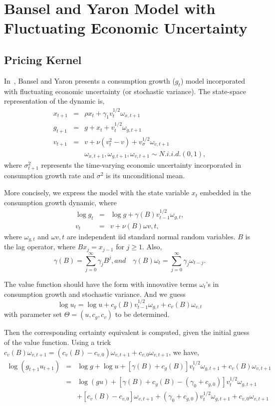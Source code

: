 \documentclass[11pt,reqno,final]{amsart}
\begin{document}
\bigskip

\section{Bansel and Yaron Model with Fluctuating Economic Uncertainty}
\subsection{Pricing Kernel} \label{sec::by2_sv}
In~\cite{BY04}, Bansel and Yaron presents a consumption growth ($g_t$) model incorporated with fluctuating economic uncertainty (or stochastic variance). The state-space representation of the dynamic is,
\begin{eqnarray}
x_{t+1} &=& \rho x_t + \gamma_1 v^{1/2}_t \omega_{x,t+1} \nonumber \\
g_{t+1} &=& g + x_t + v^{1/2}_t \omega_{g,t+1} \\
v_{t+1} &=& v + \nu(v_t^2-v) + v_{\sigma}^{1/2} \omega_{v,t+1}  \nonumber \\
    & & \omega_{x,t+1}, \omega_{g,t+1}, \omega_{v,t+1} \sim N.i.i.d. (0,1), \nonumber
\end{eqnarray}
where $\sigma^2_{t+1}$ represents the time-varying economic uncertainty incorporated in consumption growth rate and $\sigma^2$ is its unconditional mean.

More concisely, we express the model with the state variable $x_t$ embedded in the consumption growth dynamic, where
\begin{eqnarray}
\log g_t &=& \log g + \gamma(B) v_{t-1}^{1/2} \omega_{g,t}, \nonumber \\
v_t &=& v + \nu(B) \omega{v,t},
\end{eqnarray}
where $\omega_{g,t}$ and $\omega{v,t}$ are independent iid standard normal random variables. $B$ is the lag operator, where $Bx_{j} = x_{j-1}$ for $j\geq 1$. Also,
$$
\gamma(B) = \sum_{j=0}^{\infty} \gamma_j B^j, and \quad \gamma(B)\omega_t = \sum_{j=0}^{\infty} \gamma_j \omega_{t-j}.
$$

The value function should have the form with innovative terms $\omega_t$'s in consumption growth and stochastic variance. And we guess
$$
\log u_t = \log u + c_g(B)v_{t-1}^{1/2} \omega_{g,t} + c_v(B)\omega_{v,t}
$$
with parameter set $\Theta=(u, c_g, c_v)$ to be determined.

Then the corresponding certainty equivalent is computed, given the initial guess of the value function. Using a trick $c_v(B)\omega_{v,t+1}=(c_v(B)-c_{v,0})\omega_{v,t+1}+c_{v,0}\omega_{v,t+1}$, we have,
\begin{eqnarray*}
\log(g_{t+1}u_{t+1}) &=& \log g + \log u + [\gamma(B) + c_g(B)] v_t^{1/2} \omega_{g,t+1} + c_v(B)\omega_{v,t+1} \\
 &=& \log(gu) + [\gamma(B)+c_g(B)-(\gamma_0+c_{g,0})] v_t^{1/2} \omega_{g,t+1} \\
 & & + [c_v(B)-c_{v,0}] \omega_{v,t+1} + (\gamma_0+c_{g,0}) v_t^{1/2} \omega_{g,t+1} + c_{v,0} \omega_{v,t+1}
\end{eqnarray*}
\end{document}
